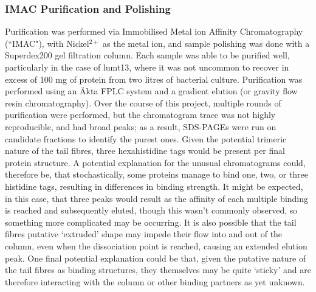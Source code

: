\subsubsection{IMAC Purification and Polishing}
Purification was performed via Immobilised Metal ion Affinity Chromatography (``IMAC"), with Nickel$^{2+}$ as the metal ion, and sample polishing was done with a Superdex200 gel filtration column. Each sample was able to be purified well, particularly in the case of lumt13, where it was not uncommon to recover in excess of 100 mg of protein from two litres of bacterial culture. Purification was performed using an \"Akta FPLC system and a gradient elution (or gravity flow resin chromatography). Over the course of this project, multiple rounds of purification were performed, but the chromatogram trace was not highly reproducible, and had broad peaks; as a result, SDS-PAGEs were run on candidate fractions to identify the purest ones. Given the potential trimeric nature of the tail fibres, three hexahistidine tags would be present per final protein structure. A potential explanation for the unusual chromatograms could, therefore be, that stochastically, some proteins manage to bind one, two, or three histidine tags, resulting in differences in binding strength. It might be expected, in this case, that three peaks would result as the affinity of each multiple binding is reached and subsequently eluted, though this wasn't commonly observed, so something more complicated may be occurring. It is also possible that the tail fibres putative `extruded' shape may impede their flow into and out of the column, even when the dissociation point is reached, causing an extended elution peak. One final potential explanation could be that, given the putative nature of the tail fibres as binding structures, they themselves may be quite `sticky' and are therefore interacting with the column or other binding partners as yet unknown.

